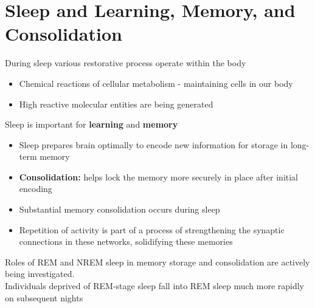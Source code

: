 \documentclass{article}
\begin{document}
\section{Sleep and Learning, Memory, and Consolidation}
During sleep various restorative process operate within the body
\begin{itemize}
    \item Chemical reactions of cellular metabolism - maintaining cells in our body
    \item High reactive molecular entities are being generated
\end{itemize}

\noindent Sleep is important for \textbf{learning} and \textbf{memory}
\begin{itemize}
    \item Sleep prepares brain optimally to encode new information for storage in long-term memory
    \item \textbf{Consolidation:} helps lock the memory more securely in place after initial encoding
    \item Substantial memory consolidation occurs during sleep
    \item Repetition of activity is part of a process of strengthening the synaptic connections in these networks, solidifying these memories
\end{itemize}

Roles of REM and NREM sleep in memory storage and consolidation are actively being investigated. \\

Individuals deprived of REM-stage sleep fall into REM sleep much more rapidly on subsequent nights
\end{document}
